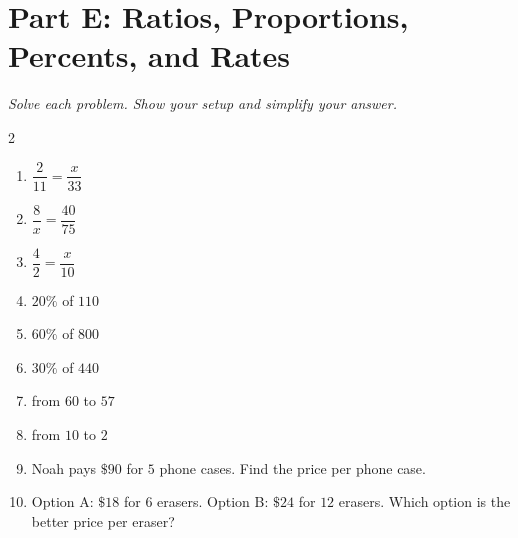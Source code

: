 \documentclass[11pt]{article}
\begin{document}
\section*{Part E: Ratios, Proportions, Percents, and Rates}
\noindent\textit{Solve each problem. Show your setup and simplify your answer.}
\begin{multicols}{2}
\begin{enumerate}
  \item $\dfrac{2}{11} = \dfrac{x}{33}$
  \vspace{1.4cm}
  \item $\dfrac{8}{x} = \dfrac{40}{75}$
  \vspace{1.4cm}
  \item $\dfrac{4}{2} = \dfrac{x}{10}$
  \vspace{1.4cm}
  \item $20\%$ of $110$
  \vspace{1.4cm}
  \item $60\%$ of $800$
  \vspace{1.4cm}
  \item $30\%$ of $440$
  \vspace{1.4cm}
  \item from $60$ to $57$
  \vspace{1.4cm}
  \item from $10$ to $2$
  \vspace{1.4cm}
  \item Noah pays $\$90$ for $5$ phone cases. Find the price per phone case.
  \vspace{1.4cm}
  \item Option A: $\$18$ for $6$ erasers. Option B: $\$24$ for $12$ erasers. Which option is the better price per eraser?
  \vspace{1.4cm}
\end{enumerate}
\end{multicols}
\end{document}
